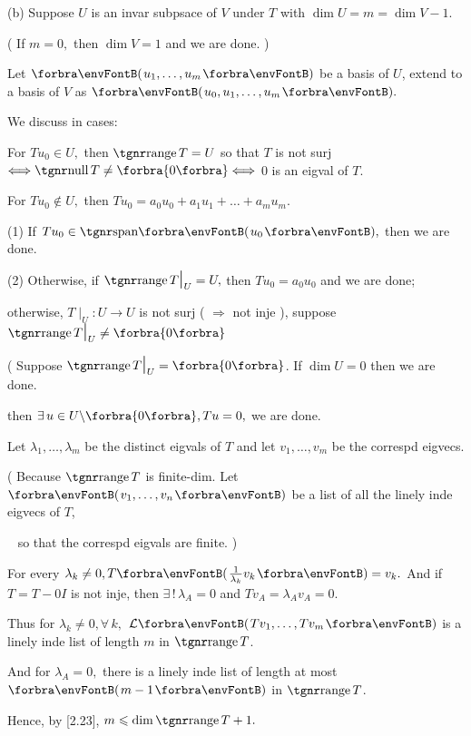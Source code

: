 \documentclass[a4paper, 11pt, UTF8]{article}
\begin{document}
\begin{large}
(b) Suppose $U$ is an invar subpsace of $V$ under $T$ with $\dim U=m=\dim V-1.$\par\quad\Hb
( If $m=0,$ then $\dim V=1$ and we are done. )\par\quad\Hb
Let $\Par{u_1,\dots,u_m}$ be a basis of $U$, extend to a basis of $V$ as $\Par{u_0,u_1,\dots,u_m}.$\par\quad\Hb
We discuss in cases:\par\quad\Hb
For $Tu_0\in U,$ then $\range T=U$ so that $T$ is not surj $\Longleftrightarrow \null T\neq\zeroSubs\Longleftrightarrow$ $0$ is an eigval of $T.$\par\quad\Hb
For $Tu_0\not\in U,$ then $Tu_0=a_0 u_0+a_1 u_1+\dots+a_mu_m.$\par\quad\Hb
(1) If $Tu_0\in\Span{u_0},$ then we are done.\par\quad\Hb
(2) Otherwise, if $\range T\mid_U=U,$ then $Tu_0=a_0 u_0$ and we are done;\par\qquad\qquad\qquad\quad\Hb
otherwise, $T\mid_U:U\rightarrow U$ is not surj ( $\Rightarrow$ not inje ), suppose $\range T\mid_U\neq\zeroSubs$\par\qquad\qquad\qquad\qquad\quad
( Suppose $\range T\mid_U=\zeroSubs$. If $\dim U=0$ then we are done.\par
{}\par\qquad\qquad\qquad\quad\Hb
then $\exists\,u\in U\backslash\zeroSubs,Tu=0,$ we are done.\PfEnd
\SepLine

\par\quad
Let $\lambda_1,\dots,\lambda_m$ be the distinct eigvals of $T$ and let $v_1,\dots,v_m$ be the correspd eigvecs.\par\quad
( Because $\range T$ is finite-dim. Let $\Par{v_1,\dots,v_n}$ be a list of all the linely inde eigvecs of $T$,\par\quad\,\,\,
so that the correspd eigvals are finite. )\par\quad
For every $\lambda_k\neq 0,T\Par{\frac{1}{\lambda_k}v_k}=v_k.$ And if $T=T-0I$ is not inje, then $\exists\,!\,\lambda_A=0$ and $Tv_A=\lambda_A v_A=0.$\par\quad
Thus for $\lambda_k\neq 0,\forall\,k,$ $\Lm{Tv_1,\dots,Tv_m}$ is a linely inde list of length $m$ in $\range T$.\par\quad
And for $\lambda_A=0,$ there is a linely inde list  of length at most $\Par{m-1}$ in $\range T$.\par\quad
Hence, by [2.23], $m\leqslant \dim\range T+1.$\PfEnd
\SepLine


\end{large}
\end{document}
